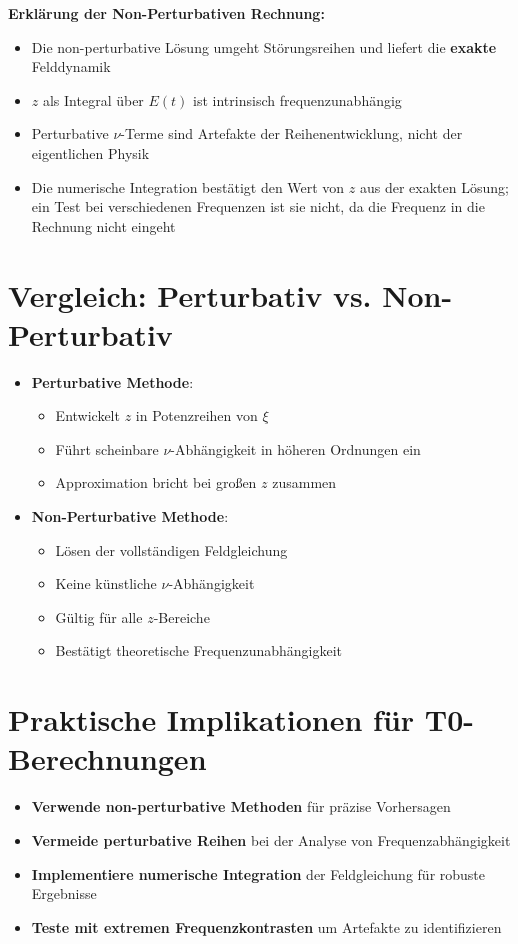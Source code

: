 	\textbf{Erklärung der Non-Perturbativen Rechnung:}
	\begin{itemize}
		\item Die non-perturbative Lösung umgeht Störungsreihen und liefert die \textbf{exakte} Felddynamik
		\item $z$ als Integral über $E(t)$ ist intrinsisch frequenzunabhängig
		\item Perturbative $\nu$-Terme sind Artefakte der Reihenentwicklung, nicht der eigentlichen Physik
		\item Die numerische Integration bestätigt den Wert von $z$ aus der exakten Lösung; ein Test bei verschiedenen Frequenzen ist sie nicht, da die Frequenz in die Rechnung nicht eingeht
	\end{itemize}
	
	\section{Vergleich: Perturbativ vs. Non-Perturbativ}
	
	\begin{itemize}
		\item \textbf{Perturbative Methode}:
		\begin{itemize}
			\item Entwickelt $z$ in Potenzreihen von $\xi$
			\item Führt scheinbare $\nu$-Abhängigkeit in höheren Ordnungen ein
			\item Approximation bricht bei großen $z$ zusammen
		\end{itemize}
		
		\item \textbf{Non-Perturbative Methode}:
		\begin{itemize}
			\item Lösen der vollständigen Feldgleichung
			\item Keine künstliche $\nu$-Abhängigkeit
			\item Gültig für alle $z$-Bereiche
			\item Bestätigt theoretische Frequenzunabhängigkeit
		\end{itemize}
	\end{itemize}
	
	\section{Praktische Implikationen für T0-Berechnungen}
	
	\begin{itemize}
		\item \textbf{Verwende non-perturbative Methoden} für präzise Vorhersagen
		\item \textbf{Vermeide perturbative Reihen} bei der Analyse von Frequenzabhängigkeit
		\item \textbf{Implementiere numerische Integration} der Feldgleichung für robuste Ergebnisse
		\item \textbf{Teste mit extremen Frequenzkontrasten} um Artefakte zu identifizieren
	\end{itemize}
	
